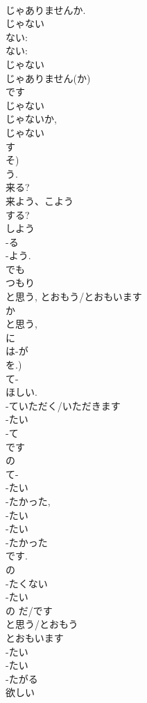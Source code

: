 \documentclass[8pt]{extreport}
\begin{document}
\begin{CJK}{UTF8}{min}
\\	じゃありませんか.
\\	じゃない 
\\	ない: 
\\	ない: 
\\	じゃない 
\\	じゃありません(か) 
\\	です
\\	じゃない 
\\	じゃないか, 
\\	じゃない 
\\	す 
\\	そ) 
\\	う.
\\	来る?
\\	来よう、こよう	
\\	する?
\\	しよう	
\\	-る 
\\	-よう.	
\\	でも 
\\	つもり 
\\	と思う, とおもう/とおもいます 
\\	か 
\\	と思う, 
\\	に 
\\	は-が 
\\	を.)
\\	て-
\\	ほしい.
\\	-ていただく/いただきます
\\	-たい			
\\	-て 
\\	です 
\\	の 
\\	て-
\\	-たい 
\\	-たかった, 
\\	-たい 
\\	-たい 
\\	-たかった 
\\	です. 
\\	の 
\\	-たくない
\\	-たい 
\\	の だ/です
\\	と思う/とおもう 
\\	とおもいます
\\	-たい　
\\	-たい 
\\	-たがる 
\\	欲しい 

\end{CJK}
\end{document}
